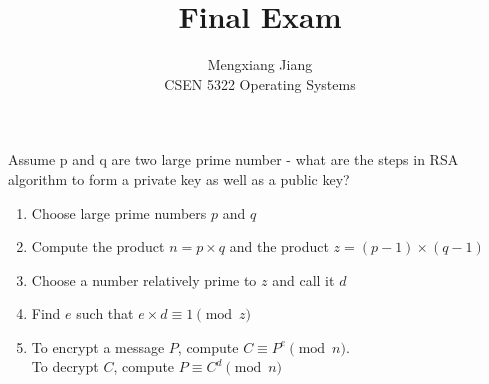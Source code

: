 \documentclass[12pt]{article}
\newenvironment{problem}[2][Problem]{\begin{trivlist}
\item[\hskip \labelsep {\bfseries #1}\hskip \labelsep {\bfseries #2.}]}{\end{trivlist}}
\begin{document}
 
 
\title{Final Exam}%
\author{Mengxiang Jiang\\ %
CSEN 5322 Operating Systems} %
 
\maketitle
 
\begin{problem}{1} %
  Assume p and q are two large prime number - what are the steps in RSA algorithm
  to form a private key as well as a public key?

  \begin{enumerate}
    \item Choose large prime numbers $p$ and $q$
    \item Compute the product $n = p \times q$ and the product $z = (p-1)\times (q-1)$
    \item Choose a number relatively prime to $z$ and call it $d$
    \item Find $e$ such that $e \times d \equiv 1 \pmod{z}$
    \item To encrypt a message $P$, compute $C \equiv P^e \pmod{n}$.\\
    To decrypt $C$, compute $P \equiv C^d \pmod{n}$
  \end{enumerate}
\end{problem}
\end{document}
